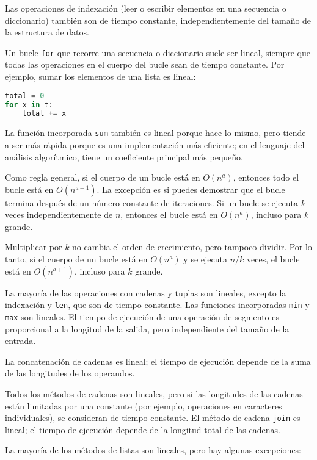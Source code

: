 Las operaciones de indexación (leer o escribir elementos en una secuencia o diccionario) también son de tiempo constante, independientemente del tamaño de la estructura de datos.

Un bucle \texttt{for} que recorre una secuencia o diccionario suele ser lineal, siempre que todas las operaciones en el cuerpo del bucle sean de tiempo constante. Por ejemplo, sumar los elementos de una lista es lineal:

\begin{lstlisting}[language=Python]
total = 0
for x in t:
    total += x
\end{lstlisting}

La función incorporada \texttt{sum} también es lineal porque hace lo mismo, pero tiende a ser más rápida porque es una implementación más eficiente; en el lenguaje del análisis algorítmico, tiene un coeficiente principal más pequeño.

Como regla general, si el cuerpo de un bucle está en \( O(n^a) \), entonces todo el bucle está en \( O(n^{a+1}) \). La excepción es si puedes demostrar que el bucle termina después de un número constante de iteraciones. Si un bucle se ejecuta \( k \) veces independientemente de \( n \), entonces el bucle está en \( O(n^a) \), incluso para \( k \) grande.

Multiplicar por \( k \) no cambia el orden de crecimiento, pero tampoco dividir. Por lo tanto, si el cuerpo de un bucle está en \( O(n^a) \) y se ejecuta \( n/k \) veces, el bucle está en \( O(n^{a+1}) \), incluso para \( k \) grande.

La mayoría de las operaciones con cadenas y tuplas son lineales, excepto la indexación y \texttt{len}, que son de tiempo constante. Las funciones incorporadas \texttt{min} y \texttt{max} son lineales. El tiempo de ejecución de una operación de segmento es proporcional a la longitud de la salida, pero independiente del tamaño de la entrada.

La concatenación de cadenas es lineal; el tiempo de ejecución depende de la suma de las longitudes de los operandos.

Todos los métodos de cadenas son lineales, pero si las longitudes de las cadenas están limitadas por una constante (por ejemplo, operaciones en caracteres individuales), se consideran de tiempo constante. El método de cadena \texttt{join} es lineal; el tiempo de ejecución depende de la longitud total de las cadenas.

La mayoría de los métodos de listas son lineales, pero hay algunas excepciones:

